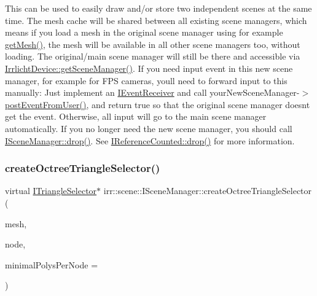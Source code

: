 This can be used to easily draw and/or store two independent scenes at the same time. The mesh cache will be shared between all existing scene managers, which means if you load a mesh in the original scene manager using for example \hyperlink{classirr_1_1scene_1_1ISceneManager_a63894c3f3d46cfc385116f1705935e03}{get\+Mesh()}, the mesh will be available in all other scene managers too, without loading. The original/main scene manager will still be there and accessible via \hyperlink{classirr_1_1IrrlichtDevice_a891b503ff4d5041296d88f23f97d7b3d}{Irrlicht\+Device\+::get\+Scene\+Manager()}. If you need input event in this new scene manager, for example for F\+PS cameras, you\textquotesingle{}ll need to forward input to this manually\+: Just implement an \hyperlink{classirr_1_1IEventReceiver}{I\+Event\+Receiver} and call your\+New\+Scene\+Manager-\/$>$\hyperlink{classirr_1_1scene_1_1ISceneManager_ac68aa8d654884f19ad52fa28f11db424}{post\+Event\+From\+User()}, and return true so that the original scene manager doesn\textquotesingle{}t get the event. Otherwise, all input will go to the main scene manager automatically. If you no longer need the new scene manager, you should call \hyperlink{classirr_1_1IReferenceCounted_a03856a09355b89d178090c4a5f738543}{I\+Scene\+Manager\+::drop()}. See \hyperlink{classirr_1_1IReferenceCounted_a03856a09355b89d178090c4a5f738543}{I\+Reference\+Counted\+::drop()} for more information. \mbox{\label{classirr_1_1scene_1_1ISceneManager_a4ed7d3b34f4d0c70395b6d464fe32b96}} 
\subsubsection{\texorpdfstring{create\+Octree\+Triangle\+Selector()}{createOctreeTriangleSelector()}}
{\footnotesize\ttfamily virtual \hyperlink{classirr_1_1scene_1_1ITriangleSelector}{I\+Triangle\+Selector}$\ast$ irr\+::scene\+::\+I\+Scene\+Manager\+::create\+Octree\+Triangle\+Selector (\begin{DoxyParamCaption}\item[{\hyperlink{classirr_1_1scene_1_1IMesh}{I\+Mesh} $\ast$}]{mesh,  }\item[{\hyperlink{classirr_1_1scene_1_1ISceneNode}{I\+Scene\+Node} $\ast$}]{node,  }\item[{\hyperlink{namespaceirr_ac66849b7a6ed16e30ebede579f9b47c6}{s32}}]{minimal\+Polys\+Per\+Node = {} }\end{DoxyParamCaption})\hspace{0.3cm}{\ttfamily [pure virtual]}}



